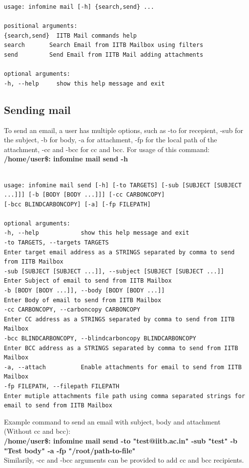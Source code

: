 \documentclass[12pt, a4paper]{article}
\begin{document}
\begin{verbatim}
usage: infomine mail [-h] {search,send} ...

positional arguments:
{search,send}  IITB Mail commands help
search       Search Email from IITB Mailbox using filters
send         Send Email from IITB Mail adding attachments

optional arguments:
-h, --help     show this help message and exit
\end{verbatim}

\subsection{Sending mail}
To send an email, a user has multiple options, such as -to for recepient, -sub for the subject, -b for body, -a for attachment, -fp for the local path of the attachment, -cc and -bcc for cc and bcc. For usage of this command: \\
\textbf{/home/user\$: infomine mail send -h}\\
\\
\begin{verbatim}
usage: infomine mail send [-h] [-to TARGETS] [-sub [SUBJECT [SUBJECT ...]]] [-b [BODY [BODY ...]]] [-cc CARBONCOPY]
[-bcc BLINDCARBONCOPY] [-a] [-fp FILEPATH]

optional arguments:
-h, --help            show this help message and exit
-to TARGETS, --targets TARGETS
Enter target email address as a STRINGS separated by comma to send from IITB Mailbox
-sub [SUBJECT [SUBJECT ...]], --subject [SUBJECT [SUBJECT ...]]
Enter Subject of email to send from IITB Mailbox
-b [BODY [BODY ...]], --body [BODY [BODY ...]]
Enter Body of email to send from IITB Mailbox
-cc CARBONCOPY, --carboncopy CARBONCOPY
Enter CC address as a STRINGS separated by comma to send from IITB Mailbox
-bcc BLINDCARBONCOPY, --blindcarboncopy BLINDCARBONCOPY
Enter BCC address as a STRINGS separated by comma to send from IITB Mailbox
-a, --attach          Enable attachments for email to send from IITB Mailbox
-fp FILEPATH, --filepath FILEPATH
Enter mutiple attachments file path using comma separated strings for email to send from IITB Mailbox
\end{verbatim}
Example command to send an email with subject, body and attachment (Without cc and bcc):\\
\textbf{/home/user\$: infomine mail send -to "test@iitb.ac.in" -sub "test" -b "Test body" -a -fp "/root/path-to-file"}\\
Similarily, -cc and -bcc arguments can be provided to add cc and bcc recipients.
\end{document}
